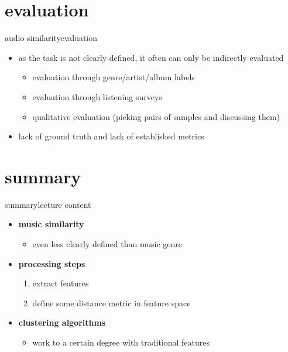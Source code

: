     \section[eval]{evaluation}
        \begin{frame}{audio similarity}{evaluation}
            \begin{itemize}
                \item   as the task is not clearly defined, it often can only be indirectly evaluated
                    \begin{itemize}
                        \item   evaluation through genre/artist/album labels
                        \item   evaluation through listening surveys
                        \item   qualitative evaluation (picking pairs of samples and discussing them)
                    \end{itemize}
                \item  lack of ground truth and lack of established metrics 
            \end{itemize}
        \end{frame}
    
    \section{summary}
        \begin{frame}{summary}{lecture content}
            \begin{itemize}
                \item   \textbf{music similarity}
                    \begin{itemize}
                        \item   even less clearly defined than music genre
                    \end{itemize}
                \bigskip
                \item   \textbf{processing steps}
                    \begin{enumerate}
                        \item   extract features
                        \item   define some distance metric in feature space
                    \end{enumerate}
                \bigskip
                \item   \textbf{clustering algorithms}
                    \begin{itemize}
                        \item   work to a certain degree with traditional features
                    \end{itemize}
            \end{itemize}
        \end{frame}

